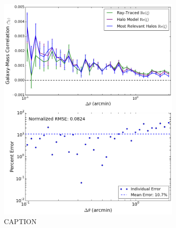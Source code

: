 \documentclass[%
 reprint,
 amsmath,amssymb,
 aps,nofootinbib
]{revtex4-1}
\begin{document}
\begin{figure}
\begin{subfigure}{0.475\textwidth}
        \label{fig:rel_gg_compare}
    \end{subfigure}
    ~~
    \begin{subfigure}{0.475\textwidth}
        \includegraphics[width=\textwidth]{figs-swe/thesis/rel_ng_compare.png}
        \captionsetup{justification=raggedright,singlelinecheck=false}
        \caption{CAPTION}
        \label{fig:rel_ng_compare}
    \end{subfigure}
    \caption{}
\end{figure}


\end{document}

